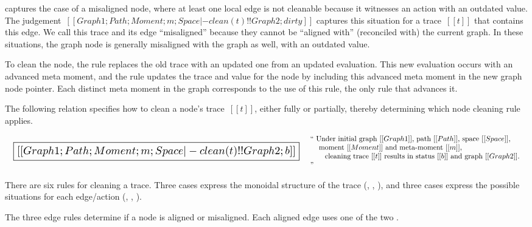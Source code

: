 \documentclass[11pt]{article}
\begin{document}
 captures the case of a misaligned node, where at least one
local edge is not cleanable because it witnesses an action with an
outdated value.
%
The judgement~$[[Graph1; Path; Moment; m; Space |- clean(t) !!
    Graph2; dirty]]$ captures this situation for a trace~$[[t]]$ that contains this edge.
%
We call this trace and its edge ``misaligned'' because they cannot be ``aligned with''
(reconciled with) the current graph.
%
In these situations, the graph node is generally misaligned with the graph as well, with an outdated value.

To clean the node, the rule replaces the old trace with an updated one
from an updated evaluation.
%
This new evaluation occurs with an advanced meta moment, and the rule
updates the trace and value for the node by including this advanced
meta moment in the new graph node pointer.
%
Each distinct meta moment in the graph corresponds to the use of this
rule, the only rule that advances it.


The following relation specifies how to clean a node's trace~$[[t]]$, either fully or partially,
thereby determining which node cleaning rule applies.

\[
\begin{array}{lc}
  {\scalebox{1.5}{
  \boxed{[[Graph1; Path; Moment; m; Space |- clean(t) !! Graph2; b]]}}}
&
\begin{array}{p{4in}}
  ``
  Under initial graph~$[[Graph1]]$,
  path~$[[Path]]$,
  space~$[[Space]]$,\\
  \hspace{3mm}~moment~$[[Moment]]$ and meta-moment~$[[m]]$,\\
  \hspace{6mm}~cleaning trace~$[[t]]$
  results in status~$[[b]]$ and graph~$[[Graph2]]$.
  ''
\end{array}
\end{array}
\]

\begin{mathpar}
\end{mathpar}

There are six rules for cleaning a trace.
%
Three cases express the monoidal structure of the
trace (, , ), and
three cases express the possible situations for each edge/action
(, ,
).

The three edge rules determine if a node is aligned or misaligned.
%
Each aligned edge uses one of the
two .
\end{document}
